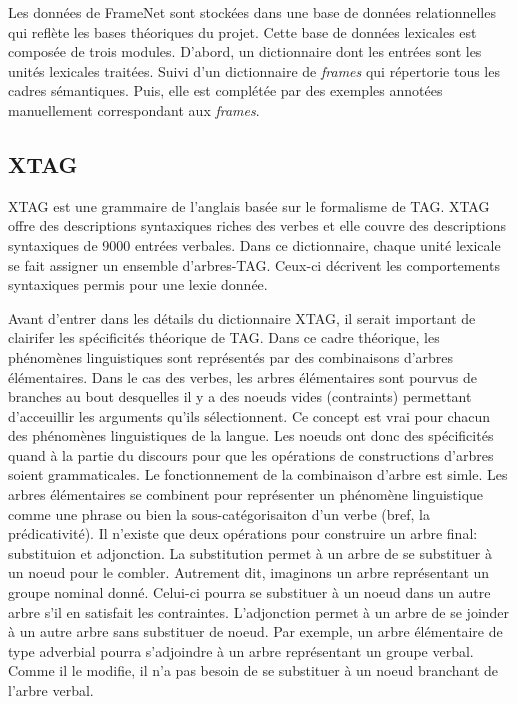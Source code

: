 Les données de FrameNet sont stockées dans une base de données relationnelles qui reflète les bases théoriques du projet. Cette base de données lexicales est composée de trois modules. D'abord, un dictionnaire dont les entrées sont les unités lexicales traitées. Suivi d'un dictionnaire de \emph{frames} qui répertorie tous les cadres sémantiques. Puis, elle est complétée par des exemples annotées manuellement correspondant aux \emph{frames}.

\subsection{XTAG}

XTAG \citep{ResearchGroupLexicalizedTreeAdjoining2001} est une grammaire de l'anglais basée sur le formalisme de \acf{TAG}. XTAG offre des descriptions syntaxiques riches des verbes et elle couvre des descriptions syntaxiques de 9000 entrées verbales.  Dans ce dictionnaire, chaque unité lexicale se fait assigner un ensemble d'arbres-TAG. Ceux-ci décrivent les comportements syntaxiques permis pour une lexie donnée.

Avant d'entrer dans les détails du dictionnaire XTAG, il serait important de clairifer les spécificités théorique de \ac{TAG}. Dans ce cadre théorique, les phénomènes linguistiques sont représentés par des combinaisons d'arbres élémentaires. Dans le cas des verbes, les arbres élémentaires sont pourvus de branches au bout desquelles il y a des noe{}uds vides (contraints) permettant d'acceuillir les arguments qu'ils sélectionnent. Ce concept est vrai pour chacun des phénomènes linguistiques de la langue. Les noe{}uds ont donc des spécificités quand à la partie du discours pour que les opérations de constructions d'arbres soient grammaticales. Le fonctionnement de la combinaison d'arbre est simle. Les arbres élémentaires se combinent pour représenter un phénomène linguistique comme une phrase ou bien la sous-catégorisaiton d'un verbe (bref, la prédicativité). Il n'existe que deux opérations pour construire un arbre final: substituion et adjonction. La substitution permet à un arbre de se substituer à un noe{}ud pour le combler. Autrement dit, imaginons un arbre représentant un groupe nominal donné. Celui-ci pourra se substituer à un noe{}ud dans un autre arbre s'il en satisfait les contraintes. L'adjonction permet à un arbre de se joinder à un autre arbre sans substituer de noe{}ud. Par exemple, un arbre élémentaire de type adverbial pourra s'adjoindre à un arbre représentant un groupe verbal. Comme il le modifie, il n'a pas besoin de se substituer à un noe{}ud branchant de l'arbre verbal.

